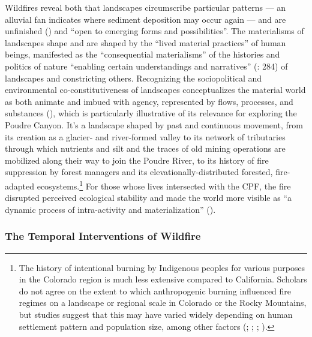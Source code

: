\documentclass[
]{article}
\begin{document}
Wildfires reveal both that landscapes circumscribe particular patterns --- an alluvial fan indicates where sediment deposition may occur again --- and are unfinished () and ``open to emerging forms and possibilities''. The materialisms of landscapes shape and are shaped by the ``lived material practices'' of human beings, manifested as the ``consequential materialisms'' of the histories and politics of nature ``enabling certain understandings and narratives'' (: 284) of landscapes and constricting others. Recognizing the sociopolitical and environmental co-constitutiveness of landscapes conceptualizes the material world as both animate and imbued with agency, represented by flows, processes, and substances (), which is particularly illustrative of its relevance for exploring the Poudre Canyon. It's a landscape shaped by past and continuous movement, from its creation as a glacier- and river-formed valley to its network of tributaries through which nutrients and silt and the traces of old mining operations are mobilized along their way to join the Poudre River, to its history of fire suppression by forest managers and its elevationally-distributed forested, fire-adapted ecosystems.\footnote{The history of intentional burning by Indigenous peoples for various purposes in the Colorado region is much less extensive compared to California. Scholars do not agree on the extent to which anthropogenic burning influenced fire regimes on a landscape or regional scale in Colorado or the Rocky Mountains, but studies suggest that this may have varied widely depending on human settlement pattern and population size, among other factors (; ; ; ).} For those whose lives intersected with the CPF, the fire disrupted perceived ecological stability and made the world more visible as ``a dynamic process of intra-activity and materialization'' ().

\subsubsection{The Temporal Interventions of Wildfire}\label{the-temporal-interventions-of-wildfire}
\end{document}
